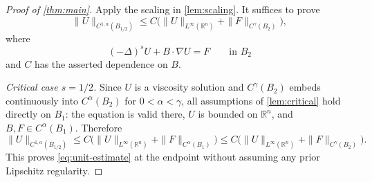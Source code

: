 \documentclass[reqno]{amsart}
\numberwithin{equation}{section}
\theoremstyle{plain}
\theoremstyle{definition}
\theoremstyle{remark}
\newcommand{\R}{\mathbb R}
\begin{document}
\begin{proof}[Proof of \cref{thm:main}]
Apply the scaling in \cref{lem:scaling}.  It suffices to prove
\begin{equation}\label{eq:unit-estimate}
 \|U\|_{C^{1,\alpha}(B_{1/2})}
 \le C\bigl(\|U\|_{L^\infty(\R^n)}+\|F\|_{C^\gamma(B_2)}\bigr),
\end{equation}
where
\[
 (-\Delta)^sU+B\cdot\nabla U=F\qquad\text{in }B_2
\]
and $C$ has the asserted dependence on $B$.

\smallskip
\noindent\emph{Critical case $s=1/2$.}
Since $U$ is a viscosity solution and $C^\gamma(B_2)$ embeds continuously
into $C^\alpha(B_2)$ for $0<\alpha<\gamma$, all assumptions of
\cref{lem:critical} hold directly on $B_1$: the equation is valid there,
$U$ is bounded on $\R^n$, and $B,F\in C^\alpha(B_1)$.  Therefore
\[
 \|U\|_{C^{1,\alpha}(B_{1/2})}
 \le C\bigl(\|U\|_{L^\infty(\R^n)}
             +\|F\|_{C^\alpha(B_1)}\bigr)
 \le C\bigl(\|U\|_{L^\infty(\R^n)}
             +\|F\|_{C^\gamma(B_2)}\bigr).
\]
This proves \eqref{eq:unit-estimate} at the endpoint without assuming any
prior Lipschitz regularity.


\end{proof}
\end{document}
